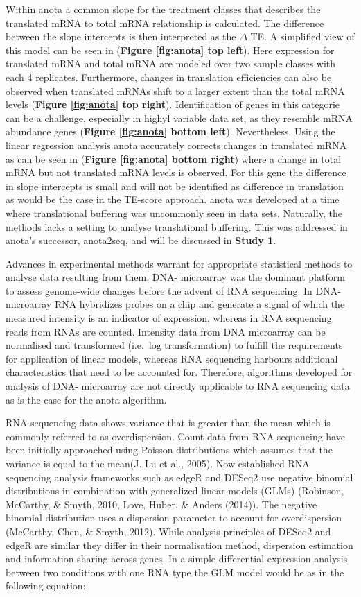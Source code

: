 \documentclass[12pt,openany]{book}
\begin{document}
Within anota a common slope for the treatment classes that describes the
translated mRNA to total mRNA relationship is calculated. The difference
between the slope intercepts is then interpreted as the \(\varDelta\)
TE. A simplified view of this model can be seen in (\textbf{Figure
\ref{fig:anota} top left}). Here expression for translated mRNA and
total mRNA are modeled over two sample classes with each 4 replicates.
Furthermore, changes in translation efficiencies can also be observed
when translated mRNAs shift to a larger extent than the total mRNA
levels (\textbf{Figure \ref{fig:anota} top right}). Identification of
genes in this categorie can be a challenge, especially in highyl
variable data set, as they resemble mRNA abundance genes (\textbf{Figure
\ref{fig:anota} bottom left}). Nevertheless, Using the linear regression
analysis anota accurately corrects changes in translated mRNA as can be
seen in (\textbf{Figure \ref{fig:anota} bottom right}) where a change in
total mRNA but not translated mRNA levels is observed. For this gene the
difference in slope intercepts is small and will not be identified as
difference in translation as would be the case in the TE-score approach.
anota was developed at a time where translational buffering was
uncommonly seen in data sets. Naturally, the methods lacks a setting to
analyse translational buffering. This was addressed in anota's
successor, anota2seq, and will be discussed in \textbf{Study 1}.

Advances in experimental methods warrant for appropriate statistical
methods to analyse data resulting from them. DNA- microarray was the
dominant platform to assess genome-wide changes before the advent of RNA
sequencing. In DNA- microarray RNA hybridizes probes on a chip and
generate a signal of which the measured intensity is an indicator of
expression, whereas in RNA sequencing reads from RNAs are counted.
Intensity data from DNA microarray can be normalised and transformed
(i.e.~log transformation) to fulfill the requirements for application of
linear models, whereas RNA sequencing harbours additional
characteristics that need to be accounted for. Therefore, algorithms
developed for analysis of DNA- microarray are not directly applicable to
RNA sequencing data as is the case for the anota algorithm.

RNA sequencing data shows variance that is greater than the mean which
is commonly referred to as overdispersion. Count data from RNA
sequencing have been initially approached using Poisson distributions
which assumes that the variance is equal to the mean(J. Lu et al.,
2005). Now established RNA sequencing analysis frameworks such as edgeR
and DESeq2 use negative binomial distributions in combination with
generalized linear models (GLMs) (Robinson, McCarthy, \& Smyth, 2010,
Love, Huber, \& Anders (2014)). The negative binomial distribution uses
a dispersion parameter to account for overdispersion (McCarthy, Chen, \&
Smyth, 2012). While analysis principles of DESeq2 and edgeR are similar
they differ in their normalisation method, dispersion estimation and
information sharing across genes. In a simple differential expression
analysis between two conditions with one RNA type the GLM model would be
as in the following equation:
\end{document}
